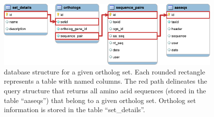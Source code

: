 \begin{figure}[h]
	\centering
	\includegraphics{img/db-orthoset.pdf}
	\caption[Database table connections for a given ortholog set]{
		\pname database structure for a given ortholog set. Each rounded rectangle
		represents a table with named columns. The red path delineates the
		 query structure that returns all amino acid sequences (stored in
		the table ``aaseqs'') that belong to a given ortholog set. Ortholog set
		information is stored in the table ``set\_details''.
	}
	\label{fig:db-orthoset}
\end{figure}
